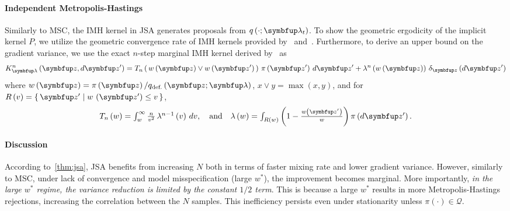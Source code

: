 \paragraph{Independent Metropolis-Hastings}
Similarly to MSC, the IMH kernel in JSA generates proposals from \(q\left(\cdot; \vlambda_t\right)\).
To show the geometric ergodicity of the implicit kernel \(P\), we utilize the geometric convergence rate of IMH kernels provided by~\citet[Theorem 2.1]{10.2307/2242610} and~\citet{wang_exact_2020}.
Furthermore, to derive an upper bound on the gradient variance, we use the exact \(n\)-step marginal IMH kernel derived by~\citet{Smith96exacttransition} as
{%
  \begin{align}
  K^n_{\vlambda}\left(\vz, d\vz^{\prime}\right) 
  = T_n\left(\, w\left(\vz\right) \vee w\left(\vz^{\prime}\right)\,\right) \, \pi\left(\vz^{\prime}\right) \, d\vz^{\prime}
  + \lambda^n\left(w\left(\vz\right)\right) \, \delta_{\vz}\left(d\vz^{\prime}\right)
  \label{eq:imh_exact_kernel}
  \end{align}
}%
where {\(w\left(\vz\right) = \pi\left(\vz\right)/q_{\text{def.}}\left(\vz; \vlambda\right)\), \(x \vee y = \max\left(x, y\right)\)}, and for {\(R\left(v\right) = \{\, \vz^{\prime} \mid w\,\left(\vz^{\prime}\right) \leq v \,\}\)}, 
{%
  \begin{align}
        \textstyle
    T_n\left(w\right)      = \int_w^{\infty}
    \frac{n}{v^2}
    \, \lambda^{n-1}\left(v\right)\,dv,
    \quad\text{and}\quad
    \lambda\left(w\right) =
    \int_{R\left(w\right)}
    \left( 1 - \frac{w\left(\vz^{\prime}\right)}{w}  \right)
    \pi\left(d\vz^{\prime}\right).\label{eq:T_lambda}
  \end{align}
}%


%
\vspace{-1ex}
\paragraph{Discussion}
According to~\cref{thm:jsa}, JSA benefits from increasing \(N\) both in terms of faster mixing rate and lower gradient variance.
However, similarly to MSC, under lack of convergence and model misspecification (large \(w^*\)), the improvement becomes marginal.
More importantly, \textit{in the large \(w^*\) regime, the variance reduction is limited by the constant \(1/2\) term}.
This is because a large \(w^*\) results in more Metropolis-Hastings rejections, increasing the correlation between the \(N\) samples.
This inefficiency persists even under stationarity unless \(\pi\left(\cdot\right) \in \mathcal{Q}\).


